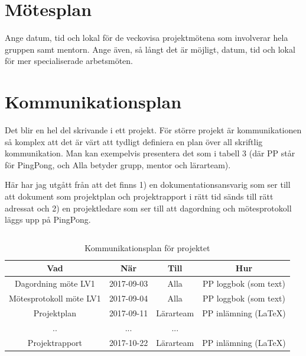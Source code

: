 \documentclass{article}
\begin{document}
\section{Mötesplan}
Ange datum, tid och lokal för de veckovisa projektmötena som involverar hela
gruppen samt mentorn. Ange även, så långt det är möjligt, datum, tid och lokal
för mer specialiserade arbetsmöten.

\section{Kommunikationsplan}
Det blir en hel del skrivande i ett projekt. För större projekt är kommunikationen så komplex att det är värt att tydligt definiera en plan över all skriftlig
kommunikation. Man kan exempelvis presentera det som i tabell 3 (där PP står
för PingPong, och Alla betyder grupp, mentor och lärarteam).\par
Här har jag utgått från att det finns 1) en dokumentationsansvarig som ser
till att dokument som projektplan och projektrapport i rätt tid sänds till rätt
adressat och 2) en projektledare som ser till att dagordning och mötesprotokoll
läggs upp på PingPong.

\begin{center}
\begin{tabular}{ |c|c|c|c| } 
 \hline

\end{tabular}
\end{center}

\begin{table}[!h]
\begin{center}
\begin{tabular}{ |c|c|c|c| } 
\hline
Vad & När & Till & Hur \\ 
\hline
\hline
Dagordning möte LV1 & 2017-09-03 & Alla & PP loggbok (som text)\\ 
\hline
Mötesprotokoll möte LV1 & 2017-09-04 & Alla & PP loggbok (som text) \\ 
\hline
Projektplan & 2017-09-11 & Lärarteam & PP inlämning (LaTeX) \\ 
\hline
.. & ... & ... \\
\hline
Projektrapport & 2017-10-22 & Lärarteam & PP inlämning (LaTeX) \\
\hline
\end{tabular}
\caption{Kommunikationsplan för projektet}
\label{kommunikationstabell}
\end{center}
\end{table}
\end{document}
